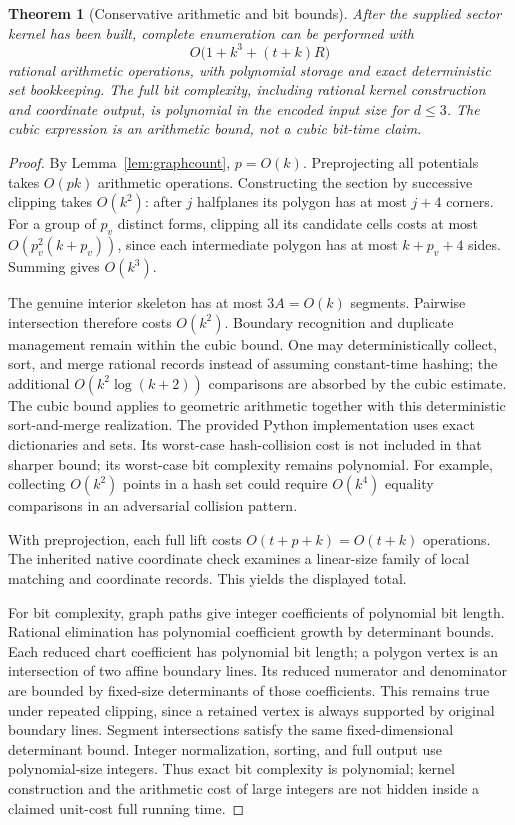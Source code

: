 \documentclass[11pt,letterpaper]{article}
\newtheorem{theorem}{Theorem}[section]
\theoremstyle{definition}
\theoremstyle{remark}\newtheorem{remark}[theorem]{Remark}
\begin{document}
\begin{theorem}[Conservative arithmetic and bit bounds]
\label{thm:complexity}
After the supplied sector kernel has been built, complete enumeration can
be performed with
\[
 O\bigl(1+k^3+(t+k)R\bigr)
\]
rational arithmetic operations, with polynomial storage and exact
deterministic set bookkeeping. The full bit complexity, including rational
kernel construction and coordinate output, is polynomial in the encoded
input size for $d\le3$. The cubic expression is an arithmetic bound,
not a cubic bit-time claim.
\end{theorem}

\begin{proof}
By Lemma~\ref{lem:graphcount}, $p=O(k)$. Preprojecting all potentials
takes $O(pk)$ arithmetic operations. Constructing the section by successive
clipping takes $O(k^2)$: after $j$ halfplanes its polygon has at most
$j+4$ corners. For a group of $p_v$ distinct forms, clipping all its
candidate cells costs at most $O(p_v^2(k+p_v))$, since each intermediate
polygon has at most $k+p_v+4$ sides. Summing gives $O(k^3)$.

The genuine interior skeleton has at most $3A=O(k)$ segments. Pairwise
intersection therefore costs $O(k^2)$. Boundary recognition and duplicate
management remain within the cubic bound. One may deterministically
collect, sort, and merge rational records instead of assuming constant-time
hashing; the additional $O(k^2\log(k+2))$ comparisons are absorbed by
the cubic estimate. The cubic bound applies to geometric arithmetic together with this
deterministic sort-and-merge realization. The provided Python implementation
uses exact dictionaries and sets. Its worst-case hash-collision cost is
not included in that sharper bound; its worst-case bit complexity remains
polynomial. For example, collecting $O(k^2)$ points in a hash set could
require $O(k^4)$ equality comparisons in an adversarial collision pattern.

With preprojection, each full lift costs $O(t+p+k)=O(t+k)$ operations.
The inherited native coordinate check examines a linear-size family of
local matching and coordinate records. This yields the displayed total.

For bit complexity, graph paths give integer coefficients of polynomial
bit length. Rational elimination has polynomial coefficient growth by
determinant bounds. Each reduced chart coefficient has polynomial bit
length; a polygon vertex is an intersection of two affine boundary lines.
Its reduced numerator and denominator are bounded by fixed-size
determinants of those coefficients. This remains true under repeated
clipping, since a retained vertex is always supported by original
boundary lines. Segment intersections satisfy the same fixed-dimensional
determinant bound. Integer normalization, sorting, and full output use
polynomial-size integers. Thus exact bit complexity is polynomial; kernel
construction and the arithmetic cost of large integers are not hidden
inside a claimed unit-cost full running time.
\end{proof}
\end{document}
